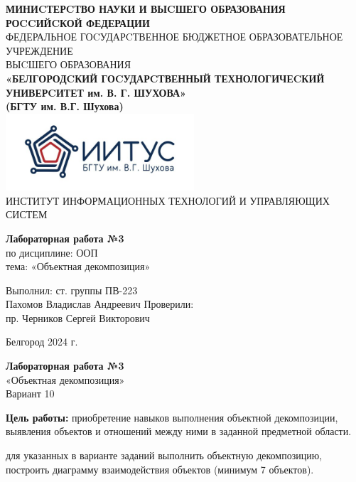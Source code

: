 \documentclass[a4paper,14pt]{extarticle}
\newcommand\textbox[1]{
	\parbox{.45\textwidth}{#1}
}
\begin{document}
\begin{center}
    \small{
        \textbf{МИНИCТЕРCТВО НАУКИ И ВЫCШЕГО ОБРАЗОВАНИЯ РОCCИЙCКОЙ ФЕДЕРАЦИИ}\\
        ФЕДЕРАЛЬНОЕ ГОCУДАРCТВЕННОЕ БЮДЖЕТНОЕ ОБРАЗОВАТЕЛЬНОЕ УЧРЕЖДЕНИЕ\\ВЫCШЕГО ОБРАЗОВАНИЯ \\
        \textbf{«БЕЛГОРОДCКИЙ ГОCУДАРCТВЕННЫЙ ТЕХНОЛОГИЧЕCКИЙ\\УНИВЕРCИТЕТ им. В. Г. ШУХОВА»\\ (БГТУ им. В.Г. Шухова)} \\
        \bigbreak
        \includegraphics[width=70mm]{log}\\
        ИНСТИТУТ ИНФОРМАЦИОННЫХ ТЕХНОЛОГИЙ И УПРАВЛЯЮЩИХ СИСТЕМ\\}
\end{center}

\vfill
\begin{center}
    \large{
        \textbf{
            Лабораторная работа №3}}\\
    \normalsize{
        по дисциплине: ООП \\
        тема: «Объектная декомпозиция»}
\end{center}
\vfill
\hfill\textbox{
    Выполнил: ст. группы ПВ-223\\Пахомов Владислав Андреевич
    \bigbreak
    Проверили: \\пр. Черников Сергей Викторович
}
\vfill\begin{center}
    Белгород 2024 г.
\end{center}
\newpage
\begin{center}
    \textbf{Лабораторная работа №3}\\
    «Объектная декомпозиция»\\
    Вариант 10
\end{center}
\textbf{Цель работы: }приобретение навыков выполнения объектной
декомпозиции, выявления объектов и отношений между ними в заданной
предметной области.

для указанных в варианте заданий выполнить
объектную декомпозицию, построить диаграмму взаимодействия объектов
(минимум 7 объектов).\\
\end{document}
